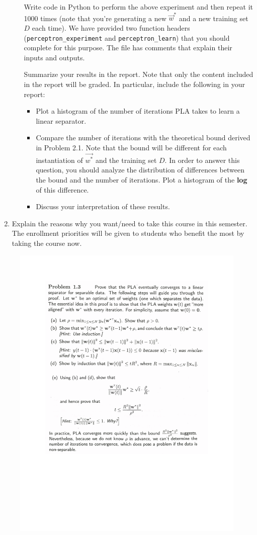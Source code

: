 \documentclass[11pt]{article}
\begin{document}
\begin{enumerate}
\begin{itemize}
  Write code in Python to perform the above experiment and then repeat
  it 1000 times (note that you're generating a new $\vec{w}^*$
  and a new training set $D$ each time). We have provided 
  two function headers (\texttt{perceptron\_experiment} and \texttt{perceptron\_learn}) that you should complete for this
  purpose. The file has comments that explain their inputs and
  outputs. 

  Summarize your results in the report. Note that only the content included in the report will be graded. In particular, include the following in your report:
  \begin{itemize}
    \item Plot a histogram of the number of iterations PLA takes to learn a linear separator.
    \item Compare the number of iterations with the theoretical bound derived in Problem 2.1. 
  Note that the bound will be different for each instantiation of $\vec{w^*}$ and the training set $D$. 
  In order to answer this question, you should analyze the
  distribution of differences between the bound and the number of
  iterations. Plot a histogram of the \textbf{log} of this difference.
  \item Discuss your interpretation of these results.
  \end{itemize}
  

\end{itemize}

\item Explain the reasons why you want/need to take this course in this semester. 
The enrollment priorities will be given to students who benefit the most by taking the course now. 

\end{enumerate}

\begin{figure}
  \includegraphics[width=\linewidth]{hw0-q1.pdf}
\end{figure}
\end{document}
